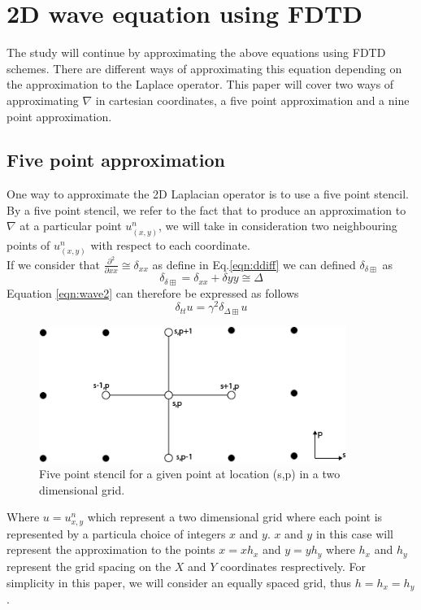 \section{2D wave equation using FDTD}
\label{chapter3:sec1}
The study will continue by approximating the above equations using FDTD schemes. There are different ways of approximating this equation depending on the approximation to the Laplace operator. This paper will cover two ways of approximating $\nabla$ in cartesian coordinates, a five point approximation and a nine point approximation.
\subsection{Five point approximation}
\label{chapter3:sec1:ssec1}
One way to approximate the 2D Laplacian operator is to use a five point stencil. By a five point stencil, we refer to the fact that to produce an approximation to $\nabla$ at a particular point $u_{(x,y)}^{n}$, we will take in consideration two neighbouring points of $u_{(x,y)}^{n}$ with respect to each coordinate.\\
If we consider that $\frac{\partial^{2}}{\partial xx}\cong\delta_{xx}$ as define in Eq.\ref{eqn:ddiff} we can defined $\delta_{\delta\boxplus}$ as
\begin{equation}
	\delta_{\delta\boxplus}=\delta_{xx}+\delta{yy}\cong \Delta
\end{equation}
Equation \ref{eqn:wave2} can therefore be expressed as follows
\begin{equation}
	\delta_{tt}u=\gamma^{2}\delta_{\Delta\boxplus}u
\end{equation}
\begin{figure}[tb!]
\begin{center}
\includegraphics[width=10cm]{./Chapter_3/_Figs/5point.png}
\caption{Five point stencil for a given point at location (s,p) in a two dimensional grid.}
\label{figs:5point}
\end{center}
\end{figure}
Where $u=u^{n}_{x,y}$  which represent a two dimensional grid where each point is represented by a particula choice of integers $x$ and $y$. $x$ and $y$ in this case will represent the approximation to the points $x=xh_{x}$ and $y=yh_{y}$ where $h_{x}$ and $h_{y}$ represent the grid spacing on the $X$ and $Y$ coordinates resprectively. For simplicity in this paper, we will consider an equally spaced grid, thus $h=h_{x}=h_{y}$.\\
